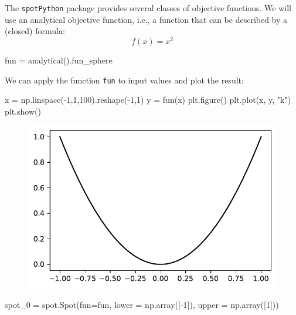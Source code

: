 \documentclass[
  letterpaper,
  DIV=11,
  numbers=noendperiod]{scrreprt}
\newenvironment{Shaded}{\begin{snugshade}}{\end{snugshade}}
\newcommand{\DecValTok}[1]{\textcolor[rgb]{0.68,0.00,0.00}{#1}}
\newcommand{\NormalTok}[1]{\textcolor[rgb]{0.00,0.23,0.31}{#1}}
\newcommand{\OperatorTok}[1]{\textcolor[rgb]{0.37,0.37,0.37}{#1}}
\newcommand{\StringTok}[1]{\textcolor[rgb]{0.13,0.47,0.30}{#1}}
\begin{document}
The \texttt{spotPython} package provides several classes of objective
functions. We will use an analytical objective function, i.e., a
function that can be described by a (closed) formula: \[f(x) = x^2\]

\begin{Shaded}
\begin{Highlighting}[]
\NormalTok{fun }\OperatorTok{=}\NormalTok{ analytical().fun\_sphere}
\end{Highlighting}
\end{Shaded}

We can apply the function \texttt{fun} to input values and plot the
result:

\begin{Shaded}
\begin{Highlighting}[]
\NormalTok{x }\OperatorTok{=}\NormalTok{ np.linspace(}\OperatorTok{{-}}\DecValTok{1}\NormalTok{,}\DecValTok{1}\NormalTok{,}\DecValTok{100}\NormalTok{).reshape(}\OperatorTok{{-}}\DecValTok{1}\NormalTok{,}\DecValTok{1}\NormalTok{)}
\NormalTok{y }\OperatorTok{=}\NormalTok{ fun(x)}
\NormalTok{plt.figure()}
\NormalTok{plt.plot(x, y, }\StringTok{"k"}\NormalTok{)}
\NormalTok{plt.show()}
\end{Highlighting}
\end{Shaded}

\begin{figure}[H]

{\centering \includegraphics{01_spot_intro_files/figure-pdf/cell-4-output-1.pdf}

}

\end{figure}

\begin{Shaded}
\begin{Highlighting}[]
\NormalTok{spot\_0 }\OperatorTok{=}\NormalTok{ spot.Spot(fun}\OperatorTok{=}\NormalTok{fun,}
\NormalTok{                   lower }\OperatorTok{=}\NormalTok{ np.array([}\OperatorTok{{-}}\DecValTok{1}\NormalTok{]),}
\NormalTok{                   upper }\OperatorTok{=}\NormalTok{ np.array([}\DecValTok{1}\NormalTok{]))}
\end{Highlighting}
\end{Shaded}
\end{document}
